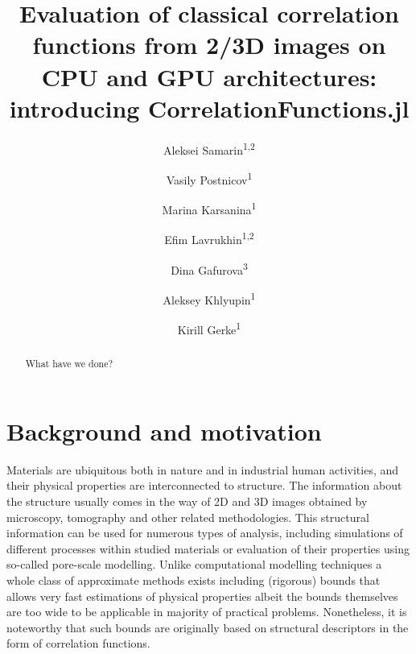 \documentclass[reprint,amsmath,amssymb,aps,pre,showkeys,showpacs,nofootinbib]{revtex4-1}
\begin{document}

\author{Aleksei Samarin\textsuperscript{1,2}}
\author{Vasily Postnicov\textsuperscript{1}}
\author{Marina Karsanina\textsuperscript{1}}
\author{Efim Lavrukhin\textsuperscript{1,2}}
\author{Dina Gafurova\textsuperscript{3}}
\author{Aleksey Khlyupin\textsuperscript{1}}
\author{Kirill Gerke\textsuperscript{1}}


\title{Evaluation of classical correlation functions from 2/3D images on CPU and
  GPU architectures: introducing CorrelationFunctions.jl}

\begin{abstract}
  What have we done?
\end{abstract}

\maketitle

\section{Background and motivation}
Materials are ubiquitous both in nature and in industrial human activities, and
their physical properties are interconnected to
structure\cite{Torquato_book}\cite{Sahimi_book}\cite{Adler_recon}. The information
about the structure usually comes in the way of 2D and 3D images obtained by
microscopy, tomography and other related methodologies. This structural
information can be used for numerous types of analysis, including simulations of
different processes within studied materials or evaluation of their properties
using so-called pore-scale modelling. Unlike computational modelling techniques
a whole class of approximate methods exists including (rigorous) bounds that
allows very fast estimations of physical properties albeit the bounds themselves
are too wide to be applicable in majority of practical problems. Nonetheless, it
is noteworthy that such bounds are originally based on structural descriptors in
the form of correlation functions.
\end{document}
